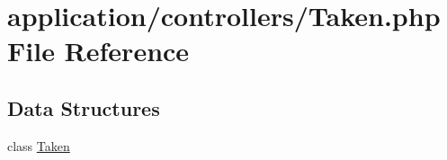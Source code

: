 \hypertarget{_taken_8php}{}\section{application/controllers/\+Taken.php File Reference}
\label{_taken_8php}
\subsection*{Data Structures}
\begin{DoxyCompactItemize}
\item 
class \mbox{\hyperlink{class_taken}{Taken}}
\end{DoxyCompactItemize}
